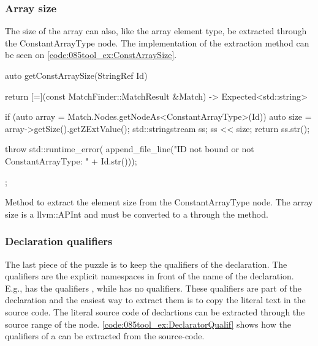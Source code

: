 \subsubsection*{Array size}

The size of the array can also, like the array element type, be extracted through the ConstantArrayType node. The implementation of the extraction method can be seen on \cref{code:085tool_ex:ConstArraySize}.

\begin{listing}[H]
    \begin{cppcode}
auto getConstArraySize(StringRef Id) {
    return [=](const MatchFinder::MatchResult &Match) -> Expected<std::string> {
        if (auto array = Match.Nodes.getNodeAs<ConstantArrayType>(Id)) {
            auto size = array->getSize().getZExtValue();
            std::stringstream ss;
            ss << size;
            return ss.str();
        }

        throw std::runtime_error(
			    append_file_line("ID not bound or not ConstantArrayType: " + Id.str()));
    };
}
    \end{cppcode}
    \caption{Method to extract the element size from the ConstantArrayType node. The array size is a llvm::APInt and must be converted to a  through the  method.}
    \label{code:085tool_ex:ConstArraySize}
\end{listing}

\subsubsection*{Declaration qualifiers}

The last piece of the puzzle is to keep the qualifiers of the declaration. The qualifiers are the explicit namespaces in front of the name of the declaration. E.g.,  has the qualifiers , while  has no qualifiers. These qualifiers are part of the declaration and the easiest way to extract them is to copy the literal text in the source code. The literal source code of declartions can be extracted through the source range of the node. \cref{code:085tool_ex:DeclaratorQualif} shows how the qualifiers of a  can be extracted from the source-code.

